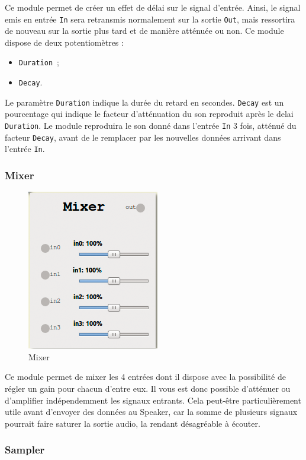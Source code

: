 \documentclass[a4paper,oneside,frenchb,12pt]{article}
\begin{document}
Ce module permet de créer un effet de délai sur le signal d'entrée.
Ainsi, le signal emis en entrée \verb!In! sera retransmis normalement
sur la sortie \verb!Out!, mais ressortira de nouveau sur la sortie plus
tard et de manière atténuée ou non. Ce module dispose de deux
potentiomètres :

\begin{itemize}
\item
  \verb!Duration!~;
\item
  \verb!Decay!.
\end{itemize}
Le paramètre \verb!Duration! indique la durée du retard en secondes.
\verb!Decay! est un pourcentage qui indique le facteur d'atténuation du
son reproduit après le delai \verb!Duration!. Le module reproduira le
son donné dans l'entrée \verb!In! 3 fois, atténué du facteur
\verb!Decay!, avant de le remplacer par les nouvelles données arrivant
dans l'entrée \verb!In!.

\subsubsection{Mixer}

\begin{figure}[h!]
\centering
\includegraphics[scale=0.5]{../img/png/mixer.png}
\caption{Mixer}
\end{figure}

Ce module permet de mixer les 4 entrées dont il dispose avec la
possibilité de régler un gain pour chacun d'entre eux. Il vous est donc
possible d'atténuer ou d'amplifier indépendemment les signaux entrants.
Cela peut-être particulièrement utile avant d'envoyer des données au
Speaker, car la somme de plusieurs signaux pourrait faire saturer la
sortie audio, la rendant désagréable à écouter.

\subsubsection{Sampler}
\end{document}
